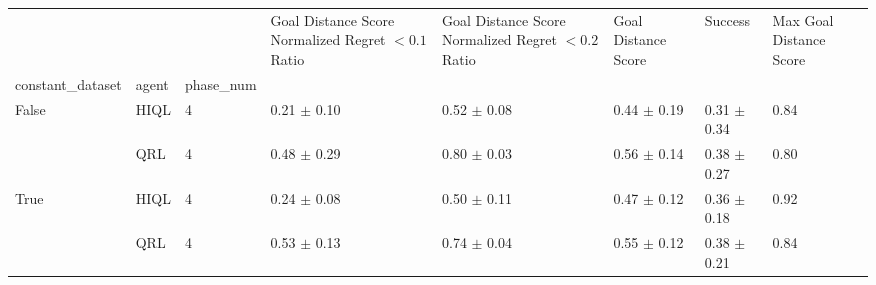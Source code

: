 \begin{tabular}{llllllll}
\toprule
 &  &  & Goal Distance Score Normalized Regret $< 0.1$ Ratio & Goal Distance Score Normalized Regret $< 0.2$ Ratio & Goal Distance Score & Success & Max Goal Distance Score \\
constant_dataset & agent & phase_num &  &  &  &  &  \\
\midrule
\multirow[t]{2}{*}{False} & HIQL & 4 & 0.21 $\pm$ 0.10 & 0.52 $\pm$ 0.08 & 0.44 $\pm$ 0.19 & 0.31 $\pm$ 0.34 & 0.84 \\
\cline{2-8}
 & QRL & 4 & 0.48 $\pm$ 0.29 & 0.80 $\pm$ 0.03 & 0.56 $\pm$ 0.14 & 0.38 $\pm$ 0.27 & 0.80 \\
\cline{1-8} \cline{2-8}
\multirow[t]{2}{*}{True} & HIQL & 4 & 0.24 $\pm$ 0.08 & 0.50 $\pm$ 0.11 & 0.47 $\pm$ 0.12 & 0.36 $\pm$ 0.18 & 0.92 \\
\cline{2-8}
 & QRL & 4 & 0.53 $\pm$ 0.13 & 0.74 $\pm$ 0.04 & 0.55 $\pm$ 0.12 & 0.38 $\pm$ 0.21 & 0.84 \\
\cline{1-8} \cline{2-8}
\bottomrule
\end{tabular}
